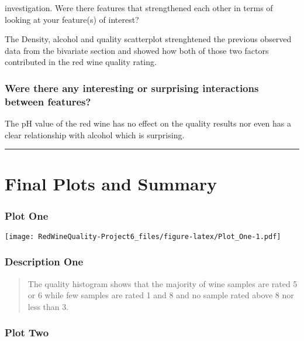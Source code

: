 \documentclass[]{article}
\begin{document}
investigation. Were there features that strengthened each other in terms
of\\
looking at your feature(s) of interest?

The Density, alcohol and quality scatterplot strenghtened the previous
observed data from the bivariate section and showed how both of those
two factors contributed in the red wine quality rating.

\hypertarget{were-there-any-interesting-or-surprising-interactions-between-features}{%
\subsubsection{Were there any interesting or surprising interactions
between
features?}\label{were-there-any-interesting-or-surprising-interactions-between-features}}

The pH value of the red wine has no effect on the quality results nor
even has a clear relationship with alcohol which is surprising.

\begin{center}\rule{0.5\linewidth}{\linethickness}\end{center}

\hypertarget{final-plots-and-summary}{%
\section{Final Plots and Summary}\label{final-plots-and-summary}}

\hypertarget{plot-one}{%
\subsubsection{Plot One}\label{plot-one}}

\texttt{[image: RedWineQuality-Project6\_files/figure-latex/Plot\_One-1.pdf]}

\hypertarget{description-one}{%
\subsubsection{Description One}\label{description-one}}

\begin{quote}
The quality histogram shows that the majority of wine samples are rated
5 or 6 while few samples are rated 1 and 8 and no sample rated above 8
nor less than 3.
\end{quote}

\hypertarget{plot-two}{%
\subsubsection{Plot Two}\label{plot-two}}
\end{document}
